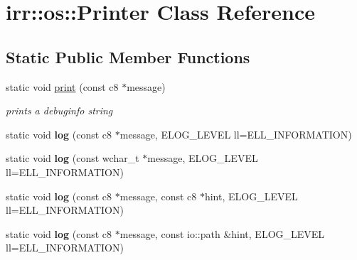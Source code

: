 \hypertarget{classirr_1_1os_1_1_printer}{\section{irr\-:\-:os\-:\-:Printer Class Reference}
\label{classirr_1_1os_1_1_printer}
}
\subsection*{Static Public Member Functions}
\begin{DoxyCompactItemize}
\item 
\hypertarget{classirr_1_1os_1_1_printer_a1da11c795f3c7e61b2764b1e120f660f}{static void \hyperlink{classirr_1_1os_1_1_printer_a1da11c795f3c7e61b2764b1e120f660f}{print} (const c8 $\ast$message)}\label{classirr_1_1os_1_1_printer_a1da11c795f3c7e61b2764b1e120f660f}

\begin{DoxyCompactList}\small\item\em prints a debuginfo string \end{DoxyCompactList}\item 
\hypertarget{classirr_1_1os_1_1_printer_af01395b2b67a24c3ee414aadc2e252cd}{static void {\bfseries log} (const c8 $\ast$message, E\-L\-O\-G\-\_\-\-L\-E\-V\-E\-L ll=E\-L\-L\-\_\-\-I\-N\-F\-O\-R\-M\-A\-T\-I\-O\-N)}\label{classirr_1_1os_1_1_printer_af01395b2b67a24c3ee414aadc2e252cd}

\item 
\hypertarget{classirr_1_1os_1_1_printer_a144a1faeec3fc44efb62de130c7e4570}{static void {\bfseries log} (const wchar\-\_\-t $\ast$message, E\-L\-O\-G\-\_\-\-L\-E\-V\-E\-L ll=E\-L\-L\-\_\-\-I\-N\-F\-O\-R\-M\-A\-T\-I\-O\-N)}\label{classirr_1_1os_1_1_printer_a144a1faeec3fc44efb62de130c7e4570}

\item 
\hypertarget{classirr_1_1os_1_1_printer_a5126652109e29030e96ffd0499ceb3e2}{static void {\bfseries log} (const c8 $\ast$message, const c8 $\ast$hint, E\-L\-O\-G\-\_\-\-L\-E\-V\-E\-L ll=E\-L\-L\-\_\-\-I\-N\-F\-O\-R\-M\-A\-T\-I\-O\-N)}\label{classirr_1_1os_1_1_printer_a5126652109e29030e96ffd0499ceb3e2}

\item 
\hypertarget{classirr_1_1os_1_1_printer_a7bd10acbe61de0ee8a67fc483a359e49}{static void {\bfseries log} (const c8 $\ast$message, const io\-::path \&hint, E\-L\-O\-G\-\_\-\-L\-E\-V\-E\-L ll=E\-L\-L\-\_\-\-I\-N\-F\-O\-R\-M\-A\-T\-I\-O\-N)}\label{classirr_1_1os_1_1_printer_a7bd10acbe61de0ee8a67fc483a359e49}

\end{DoxyCompactItemize}
